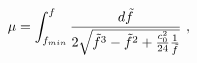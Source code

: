 \begin{equation}
\mu %
= \int^f_{f_{min}} {d\tilde{f} \over 2  \sqrt{\tilde{f}^3
    -\tilde{f}^2+{c_0^2\over 24}{1\over \tilde{f}}} }\ , 
\label{sola}
\end{equation}

